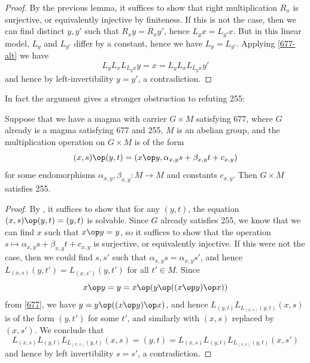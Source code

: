\begin{proof}  By the previous lemma, it suffices to show that right multiplication $R_x$ is surjective, or equivalently injective by finiteness.  If this is not the case, then we can find distinct $y,y'$ such that $R_x y = R_x y'$, hence $L_y x = L_{y'} x$. But in this linear model, $L_y$ and $L_{y'}$ differ by a constant, hence we have $L_y = L_{y'}$.  Applying \eqref{677-alt} we have
$$  L_y L_x L_{L_y x} y = x =  L_y L_x L_{L_y x} y'$$
and hence by left-invertibility $y=y'$, a contradiction.
\end{proof}

In fact the argument gives a stronger obstruction to refuting 255:

\begin{lemma}\label{linear-2} Suppose that we have a magma with carrier $G \times M$ satisfying 677, where $G$ already is a magma satisfying 677 and 255, $M$ is an abelian group, and the multiplication operation on $G \times M$ is of the form
  $$ (x,s) \op (y,t) = (x \op y, \alpha_{x,y} s + \beta_{x,y} t + c_{x,y})$$
for some endomorphisms $\alpha_{x,y},\beta_{x,y}: M \to M$ and constants $c_{x,y}$.  Then $G \times M$ satisfies 255.
\end{lemma}

\begin{proof}  By , it suffices to show that for any $(y,t)$, the equation $(x,s) \op (y,t) = (y,t)$ is solvable.  Since $G$ already satisfies 255, we know that we can find $x$ such that $x \op y = y$, so it suffices to show that the operation $s \mapsto \alpha_{x,y} s + \beta_{x,y} t + c_{x,y}$ is surjective, or equivalently injective.  If this were not the case, then we could find $s,s'$ such that $\alpha_{x,y} s = \alpha_{x,y} s'$, and hence $L_{(x,s)} (y,t') = L_{(x,s')} (y,t')$ for all $t' \in M$.  Since
  $$ x \op y = y = x \op (y \op ((x \op y) \op x))$$
  from \eqref{677}, we have $y = y \op ((x \op y) \op x)$, and hence $L_{(y,t)} L_{L_{(x,s)} (y,t)} (x,s)$ is of the form $(y,t')$ for some $t'$, and similarly with $(x,s)$ replaced by $(x,s')$.  We conclude that
$$ L_{(x,s)} L_{(y,t)} L_{L_{(x,s)} (y,t)} (x,s) = (y,t) =
L_{(x,s)} L_{(y,t)} L_{L_{(x,s)} (y,t)} (x,s')$$
and hence by left invertibility $s=s'$, a contradiction.
\end{proof}

